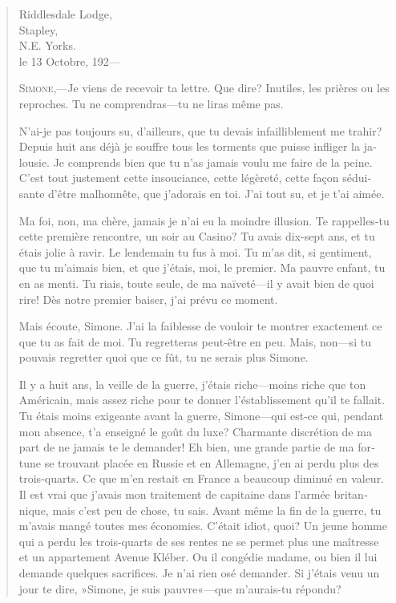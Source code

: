 \begin{quotation}
\begin{french}

\begin{flushright}
Riddlesdale Lodge,\\
Stapley,\\
N.E. Yorks.\\
le 13 Octobre, 192---
\end{flushright}

\textsc{Simone},---Je viens de recevoir ta lettre. Que dire? Inutiles, les prières ou les reproches. Tu ne comprendras\allowbreak---\allowbreak tu ne liras même pas.

N'ai-je pas toujours su, d'ailleurs, que tu devais infailliblement me
trahir? Depuis huit ans déjà je souffre tous les torments que puisse
infliger la jalousie. Je comprends bien que tu n'as jamais voulu me
faire de la peine. C'est tout justement cette insouciance, cette
légèreté, cette façon séduisante d'être malhonnête, que j'adorais en
toi. J'ai tout su, et je t'ai aimée.

Ma foi, non, ma chère, jamais je n'ai eu la moindre illusion. Te
rappelles-tu cette première rencontre, un soir au Casino? Tu avais
dix-sept ans, et tu étais jolie à ravir. Le lendemain tu fus à moi. Tu
m'as dit, si gentiment, que tu m'aimais bien, et que j'étais, moi, le
premier. Ma pauvre enfant, tu en as menti. Tu riais, toute seule, de
ma naïveté\allowbreak---\allowbreak il y avait bien de quoi rire! Dès notre premier baiser,
j'ai prévu ce moment.

Mais écoute, Simone. J'ai la faiblesse de vouloir te montrer
exactement ce que tu as fait de moi. Tu regretteras peut-être en peu.
Mais, non\allowbreak---\allowbreak si tu pouvais regretter quoi que ce fût, tu ne serais plus
Simone.

Il y a huit ans, la veille de la guerre, j'étais riche\allowbreak---\allowbreak moins riche
que ton Américain, mais assez riche pour te donner l'éstablissement
qu'il te fallait. Tu étais moins exigeante avant la guerre,
Simone\allowbreak---\allowbreak qui est-ce qui, pendant mon absence, t'a enseigné le goût du
luxe? Charmante discrétion de ma part de ne jamais te le demander! Eh
bien, une grande partie de ma fortune se trouvant placée en Russie et
en Allemagne, j'en ai perdu plus des trois-quarts. Ce que m'en restait
en France a beaucoup diminué en valeur. Il est vrai que j'avais mon
traitement de capitaine dans l'armée britannique, mais c'est peu de
chose, tu sais. Avant même la fin de la guerre, tu m'avais mangé
toutes mes économies. C'était idiot, quoi? Un jeune homme qui a perdu
les trois-quarts de ses rentes ne se permet plus une maîtresse et
un appartement Avenue Kléber. Ou il congédie madame, ou bien il lui
demande quelques sacrifices. Je n'ai rien osé demander. Si j'étais
venu un jour te dire, »Simone, je suis pauvre«---que m'aurais-tu
répondu?


\end{french}
\end{quotation}
